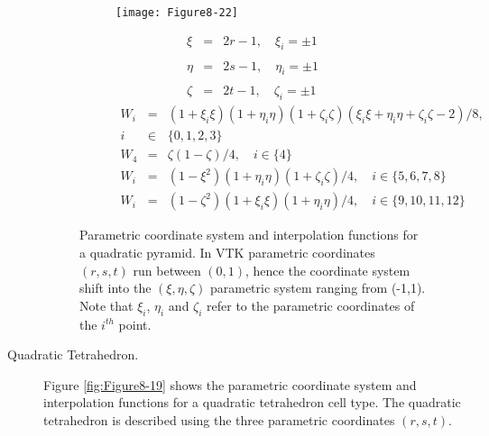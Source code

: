 \begin{description}
    \begin{figure}[!htb]
        \centering
        \begin{subfigure}{0.48\linewidth}
            \centering
            \texttt{[image: Figure8-22]}
            \caption*{}
        \end{subfigure}
        \hfill
        \begin{subfigure}{0.48\linewidth}
            \centering
            \begin{equation*}
            \begin{array}{lll}
            \xi &=& 2 r - 1, \quad \xi_i = \pm1 \\ \\
            \eta &=& 2 s - 1, \quad \eta_i = \pm1 \\ \\
            \zeta &=& 2 t - 1, \quad \zeta_i = \pm1
            \end{array}
            \end{equation*}
            \begin{equation*}
            \begin{array}{lll}
            W_i &=& (1 + \xi_i \xi)(1 + \eta_i \eta)(1 + \zeta_i \zeta)(\xi_i \xi + \eta_i \eta + \zeta_i \zeta - 2)/8, \\
            i &\in& \lbrace 0, 1, 2, 3 \rbrace \\
            W_4 &=& \zeta(1 - \zeta)/4, \quad i \in \lbrace 4 \rbrace \\
            W_i &=& (1 - \xi^2)(1 + \eta_i \eta)(1 + \zeta_i \zeta)/4, \quad i \in \lbrace 5, 6, 7, 8\rbrace \\
            W_i &=& (1 - \zeta^2)(1 + \xi_i \xi)(1 + \eta_i \eta)/4, \quad i \in \lbrace 9, 10, 11, 12 \rbrace
            \end{array}
            \end{equation*}
        \end{subfigure}%
        \caption{Parametric coordinate system and interpolation functions for a quadratic pyramid. In VTK parametric coordinates $(r,s,t)$ run between $(0,1)$, hence the coordinate system shift into the $(\xi, \eta, \zeta)$ parametric system ranging from (-1,1). Note that $\xi_i$, $\eta_i$ and $\zeta_i$ refer to the parametric coordinates of the $i^{th}$ point.}
        \label{fig:Figure8-22}
    \end{figure}

    \item[Quadratic Tetrahedron.] Figure \ref{fig:Figure8-19} shows the parametric coordinate system and interpolation functions for a quadratic tetrahedron cell type. The quadratic tetrahedron is described using the three parametric coordinates $(r,s,t)$.


\end{description}
